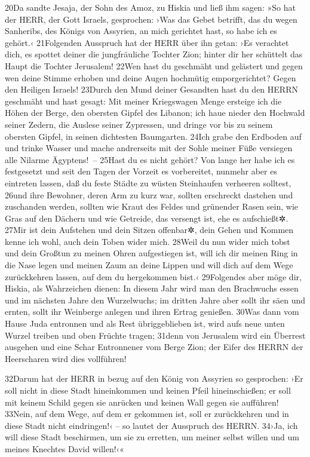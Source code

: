 20Da sandte Jesaja, der Sohn des Amoz, zu Hiskia und ließ ihm sagen: »So
hat der HERR, der Gott Israels, gesprochen: ›Was das Gebet betrifft, das
du wegen Sanheribs, des Königs von Assyrien, an mich gerichtet hast, so
habe ich es gehört.‹ 21Folgenden Ausspruch hat der HERR über ihn getan:
›Es verachtet dich, es spottet deiner die jungfräuliche Tochter Zion;
hinter dir her schüttelt das Haupt die Tochter Jerusalem! 22Wen hast du
geschmäht und gelästert und gegen wen deine Stimme erhoben und deine
Augen hochmütig emporgerichtet? Gegen den Heiligen Israels! 23Durch den
Mund deiner Gesandten hast du den HERRN geschmäht und hast gesagt: Mit
meiner Kriegswagen Menge ersteige ich die Höhen der Berge, den obersten
Gipfel des Libanon; ich haue nieder den Hochwald seiner Zedern, die
Auslese seiner Zypressen, und dringe vor bis zu seinem obersten Gipfel,
in seinen dichtesten Baumgarten. 24Ich grabe den Erdboden auf und trinke
Wasser und mache andrerseits mit der Sohle meiner Füße versiegen alle
Nilarme Ägyptens!~-- 25Hast du es nicht gehört? Von lange her habe ich
es festgesetzt und seit den Tagen der Vorzeit es vorbereitet, nunmehr
aber es eintreten lassen, daß du feste Städte zu wüsten Steinhaufen
verheeren solltest, 26und ihre Bewohner, deren Arm zu kurz war, sollten
erschreckt dastehen und zuschanden werden, sollten wie Kraut des Feldes
und grünender Rasen sein, wie Gras auf den Dächern und wie Getreide, das
versengt ist, ehe es aufschießt✲. 27Mir ist dein Aufstehen und dein
Sitzen offenbar✲, dein Gehen und Kommen kenne ich wohl, auch dein Toben
wider mich. 28Weil du nun wider mich tobst und dein Großtun zu meinen
Ohren aufgestiegen ist, will ich dir meinen Ring in die Nase legen und
meinen Zaum an deine Lippen und will dich auf dem Wege zurückkehren
lassen, auf dem du hergekommen bist.‹ 29Folgendes aber möge dir, Hiskia,
als Wahrzeichen dienen: In diesem Jahr wird man den Brachwuchs essen und
im nächsten Jahre den Wurzelwuchs; im dritten Jahre aber sollt ihr säen
und ernten, sollt ihr Weinberge anlegen und ihren Ertrag genießen. 30Was
dann vom Hause Juda entronnen und als Rest übriggeblieben ist, wird aufs
neue unten Wurzel treiben und oben Früchte tragen; 31denn von Jerusalem
wird ein Überrest ausgehen und eine Schar Entronnener vom Berge Zion;
der Eifer des HERRN der Heerscharen wird dies vollführen!

32Darum hat der HERR in bezug auf den König von Assyrien so gesprochen:
›Er soll nicht in diese Stadt hineinkommen und keinen Pfeil
hineinschießen; er soll mit keinem Schild gegen sie anrücken und keinen
Wall gegen sie aufführen! 33Nein, auf dem Wege, auf dem er gekommen ist,
soll er zurückkehren und in diese Stadt nicht eindringen!‹ -- so lautet
der Ausspruch des HERRN. 34›Ja, ich will diese Stadt beschirmen, um sie
zu erretten, um meiner selbst willen und um meines Knechtes David
willen!‹«

